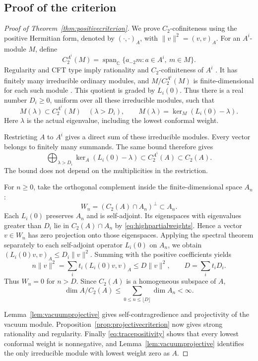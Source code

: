 \documentclass[11pt,reqno]{amsart}
\theoremstyle{definition}\newtheorem{definition}[theorem]{Definition}
\theoremstyle{remark}\newtheorem{remark}[theorem]{Remark}
\newcommand{\C}{\mathbb C}\newcommand{\Z}{\mathbb Z}\newcommand{\Q}{\mathbb Q}
\numberwithin{equation}{section}
\begin{document}
\subsection{Proof of the criterion}\label{subsec:criterionproof}
\begin{proof}[Proof of Theorem~\ref{thm:positivecriterion}]
We prove $C_2$-cofiniteness using the positive Hermitian form, denoted by $(\cdot,\cdot)_A$, with $\|v\|^2=(v,v)_A$. For an $A^i$-module $M$, define
\[
 C_2^{A^i}(M)=\operatorname{span}_{\C}\{a_{-2}m:a\in A^i,\ m\in M\}.
\]
Regularity and CFT type imply rationality and $C_2$-cofiniteness of $A^i$ \cite[Theorem 4.5]{ABD}. It has finitely many irreducible ordinary modules, and $M/C_2^{A^i}(M)$ is finite-dimensional for each such module \cite[Proposition 5.2]{ABD}. This quotient is graded by $L_i(0)$. Thus there is a real number $D_i\ge0$, uniform over all these irreducible modules, such that
\[
 M(\lambda)\subset C_2^{A^i}(M)\quad(\lambda>D_i),
 \qquad M(\lambda)=\ker_M(L_i(0)-\lambda).
\]
Here $\lambda$ is the actual eigenvalue, including the lowest conformal weight.

Restricting $A$ to $A^i$ gives a direct sum of these irreducible modules. Every vector belongs to finitely many summands. The same bound therefore gives
\begin{equation}\label{eq:highpartialweights}
 \bigoplus_{\lambda>D_i}\ker_A(L_i(0)-\lambda)
 \subset C_2^{A^i}(A)\subset C_2(A).
\end{equation}
The bound does not depend on the multiplicities in the restriction.

For $n\ge0$, take the orthogonal complement inside the finite-dimensional space $A_n$:
\[
 W_n=(C_2(A)\cap A_n)^\perp\subset A_n.
\]
Each $L_i(0)$ preserves $A_n$ and is self-adjoint. Its eigenspaces with eigenvalues greater than $D_i$ lie in $C_2(A)\cap A_n$ by \eqref{eq:highpartialweights}. Hence a vector $v\in W_n$ has zero projection onto those eigenspaces. Applying the spectral theorem separately to each self-adjoint operator $L_i(0)$ on $A_n$, we obtain $(L_i(0)v,v)_A\le D_i\|v\|^2$. Summing with the positive coefficients yields
\[
 n\|v\|^2=\sum_i t_i(L_i(0)v,v)_A
 \le D\|v\|^2,\qquad D=\sum_i t_iD_i.
\]
Thus $W_n=0$ for $n>D$. Since $C_2(A)$ is a homogeneous subspace of $A$,
\[
 \dim A/C_2(A)\le\sum_{0\le n\le\lfloor D\rfloor}\dim A_n<\infty.
\]

Lemma~\ref{lem:vacuumprojective} gives self-contragredience and projectivity of the vacuum module. Proposition~\ref{prop:projectivecriterion} now gives strong rationality and regularity. Finally \eqref{eq:tracepositivity} shows that every lowest conformal weight is nonnegative, and Lemma~\ref{lem:vacuumprojective} identifies the only irreducible module with lowest weight zero as $A$.
\end{proof}
\end{document}

